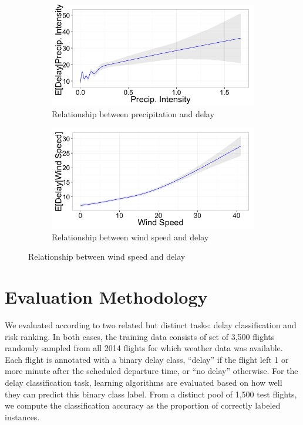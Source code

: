 \documentclass[twocolumn]{article}
\begin{document}
\begin{figure}
    \centering
\begin{subfigure}{0.45\textwidth}
    \centering
    \includegraphics[width=\linewidth]{figures/precipIntensity.png}
    \caption{Relationship between precipitation and delay}
    \label{fig:precip-delay-relationship}
\end{subfigure}
\begin{subfigure}{0.45\textwidth}
    \centering
    \includegraphics[width=\linewidth]{figures/windSpeed.png}
    \caption{Relationship between wind speed and delay}
    \label{fig:wind-speed-delay-relationship}
\end{subfigure}
\end{figure}

\begin{figure}
\end{figure}


\section{Evaluation Methodology}
\label{sec:evaluation-methodology}

We evaluated according to two related but distinct tasks: delay classification and risk ranking. In both cases, the training data consists of set of 3,500 flights randomly sampled from all 2014 flights for which weather data was available. Each flight is annotated with a binary delay class, ``delay'' if the flight left 1 or more minute after the scheduled departure time, or ``no delay'' otherwise. For the delay classification task, learning algorithms are evaluated based on how well they can predict this binary class label. From a distinct pool of 1,500 test flights, we compute the classification accuracy as the proportion of correctly labeled instances.
\end{document}
